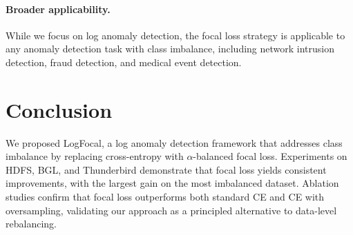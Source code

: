 \documentclass[conference]{IEEEtran}
\begin{document}
\paragraph{Broader applicability.}
While we focus on log anomaly detection, the focal loss strategy
is applicable to any anomaly detection task with class imbalance,
including network intrusion detection, fraud detection, and medical event detection.

\section{Conclusion}\label{sec:conclusion}

We proposed LogFocal, a log anomaly detection framework that addresses class imbalance
by replacing cross-entropy with $\alpha$-balanced focal loss.
Experiments on HDFS, BGL, and Thunderbird demonstrate that focal loss yields consistent improvements,
with the largest gain on the most imbalanced dataset.
Ablation studies confirm that focal loss outperforms both standard CE
and CE with oversampling, validating our approach as a principled alternative to data-level rebalancing.



\end{document}

